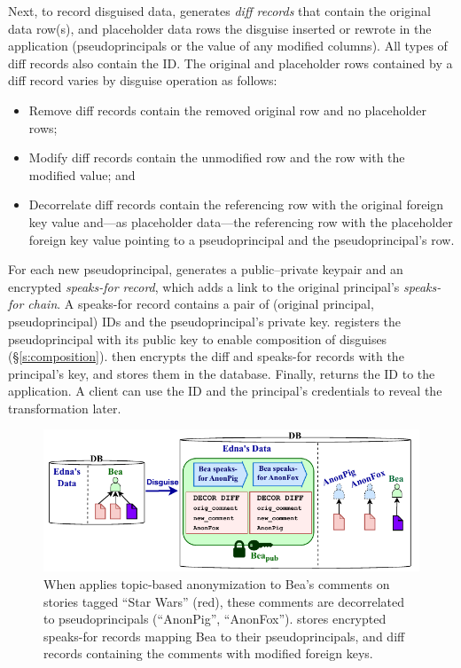 %
Next, to record disguised data, \sys generates \emph{diff records} that contain \one{}
the original data row(s), and \two{} placeholder data rows the disguise inserted
or rewrote in the application (\eg pseudoprincipals or the value of any modified
columns).
%
All types of diff records also contain the \xx ID. 
%
The original and placeholder rows contained by a diff record varies by disguise
operation as follows:
\begin{itemize}[nosep]
    \item Remove diff records contain the removed original row and no
        placeholder rows;
    \item Modify diff records contain the unmodified row and the
        row with the modified value; and
    \item Decorrelate diff records contain the referencing row with the original
        foreign key value and---as placeholder data---the referencing row with the placeholder
        foreign key value pointing to a pseudoprincipal and the pseudoprincipal's row.
\end{itemize}
%
For each new pseudoprincipal, \sys generates a public--private keypair and 
an encrypted \emph{speaks-for record}, which adds a link to the original principal's
\emph{speaks-for chain}.
A speaks-for record contains a pair of (original principal,
pseudoprincipal) IDs and the pseudoprincipal’s
private key. \sys registers the pseudoprincipal with its public key to enable
composition of disguises (\S\ref{s:composition}).
%
\sys then encrypts the diff and speaks-for records with the principal's key,
and stores them in the database.
%
%
%
Finally, \sys returns the \xx ID to the application.
%
A client can use the \xx ID and the principal's
credentials to reveal the transformation later.
%

\begin{figure}[!t]
\centering
\includegraphics{figs/lobsters_catanon_visual}
    \caption[Topic-based anonymization creates pseudoprincipals and
    disguise records.]{When \sys applies topic-based anonymization to Bea's comments on
    stories tagged ``Star Wars'' (red), these comments are decorrelated to
    pseudoprincipals (``AnonPig'', ``AnonFox''). \sys stores encrypted
    speaks-for records mapping Bea to their
    pseudoprincipals, and diff records containing the comments with
    modified foreign keys.}
\label{f:lobsters_visual}
\end{figure}



